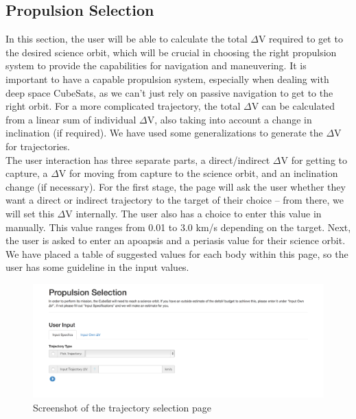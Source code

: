 \documentclass[a4, 12 pt]{article} %
\begin{document}
\subsection{Propulsion Selection}
In this section, the user will be able to calculate the total $\Delta$V required to get to the desired science orbit, which will be crucial in choosing the right propulsion system to provide the capabilities for navigation and maneuvering. It is important to have a capable propulsion system, especially when dealing with deep space CubeSats, as we can't just rely on passive navigation to get to the right orbit. For a more complicated trajectory, the total $\Delta$V can be calculated from a linear sum of individual $\Delta$V, also taking into account a change in inclination (if required). We have used some generalizations to generate the $\Delta$V for trajectories.\\[3mm] 
The user interaction has three separate parts, a direct/indirect $\Delta$V for getting to capture, a $\Delta$V for moving from capture to the science orbit, and an inclination change (if necessary). For the first stage, the page will ask the user whether they want a direct or indirect trajectory to the target of their choice -- from there, we will set this $\Delta$V internally. The user also has a choice to enter this value in manually. This value ranges from 0.01 to 3.0 km/s depending on the target. Next, the user is asked to enter an apoapsis and a periasis value for their science orbit. We have placed a table of suggested values for each body within this page, so the user has some guideline in the input values.
\begin{figure}[H]
\begin{center}
\includegraphics[width=\linewidth]{4a}
\caption{Screenshot of the trajectory selection page}
\label{default}
\end{center}
\end{figure}
\end{document}
